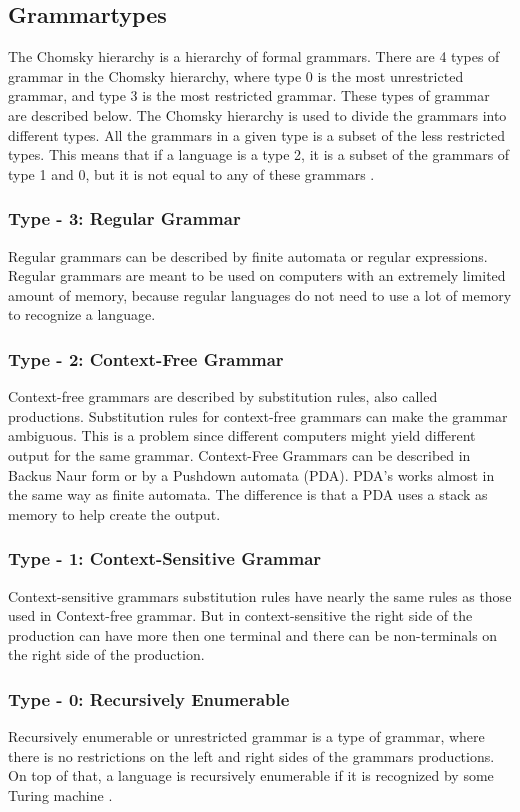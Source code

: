 \subsection{Grammartypes}
The Chomsky hierarchy is a hierarchy of formal grammars. There are 4 types of grammar in the Chomsky hierarchy, where type 0 is the most unrestricted grammar, and type 3 is the most restricted grammar. These types of grammar are described below. The Chomsky hierarchy is used to divide the grammars into different types. All the grammars in a given type is a subset of the less restricted types. This means that if a language is a type 2, it is a subset of the grammars of type 1 and 0, but it is not equal to any of these grammars \citep{Chomsky}.

\subsubsection{Type - 3: Regular Grammar}
Regular grammars can be described by finite automata or regular expressions. Regular grammars are meant to be used on computers with an extremely limited amount of memory, because regular languages do not need to use a lot of memory to recognize a language\citep{sipser}.

\subsubsection{Type - 2: Context-Free Grammar}
Context-free grammars are described by substitution rules, also called productions. Substitution rules for context-free grammars can make the grammar ambiguous.
This is a problem since different computers might yield different output for the same grammar.
Context-Free Grammars can be described in Backus Naur form or by a Pushdown automata (PDA). PDA's works almost in the same way as finite automata. The difference is that a PDA uses a stack as memory to help create the output\citep{sipser}. 

\subsubsection{Type - 1: Context-Sensitive Grammar}
Context-sensitive grammars substitution rules have nearly the same rules as those used in Context-free grammar. But in context-sensitive the right side of the production can have more then one terminal and there can be non-terminals on the right side of the production. 

\subsubsection{Type - 0: Recursively Enumerable}
Recursively enumerable or unrestricted grammar is a type of grammar, where there is no restrictions on the left and right sides of the grammars productions. On top of that, a language is recursively enumerable if it is recognized by some Turing machine \citep{sipser}.  %

